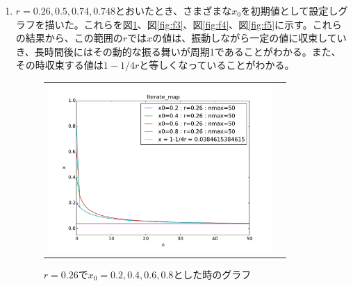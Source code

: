 \documentclass{jsarticle}
\begin{document}
\begin{enumerate}
  \begin{enumerate}
   \item $r=0.26, 0.5, 0.74, 0.748$とおいたとき、さまざまな$x_{0}$を初期値として設定しグラフを描いた。これらを図\ref{fig:f2}、図\ref{fig:f3}、図\ref{fig:f4}、図\ref{fig:f5}に示す。これらの結果から、この範囲の$r$では$x$の値は、振動しながら一定の値に収束していき、長時間後にはその動的な振る舞いが周期1であることがわかる。また、その時収束する値は$1-1/4r$と等しくなっていることがわかる。
   \begin{figure}[H]
   \begin{center}
    \begin{tabular}{cc}
    
      \begin{minipage}{0.5\hsize}
	\begin{center}
	  \includegraphics[width=8.5cm]{figure_2.pdf}
	  \caption{$r=0.26$で$x_{0}=0.2, 0.4, 0.6, 0.8$とした時のグラフ}
	  \label{fig:f2}
	\end{center}
      \end{minipage}
      

\end{tabular}
\end{center}
\end{figure}
\end{enumerate}
\end{enumerate}
\end{document}

